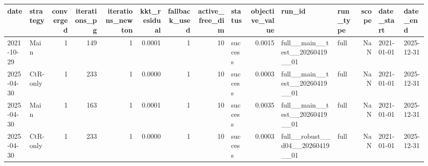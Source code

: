 \begin{tabular}{llrrrrrrlrllrll}
\toprule
date & strategy & converged & iterations_pg & iterations_newton & kkt_residual & fallback_used & active_free_dim & status & objective_value & run_id & run_type & scope & date_start & date_end \\
\midrule
2021-10-29 & Main & 1 & 149 & 1 & 0.0001 & 1 & 10 & success & 0.0015 & full__main__test__20260419__01 & full & NaN & 2021-01-01 & 2025-12-31 \\
2025-04-30 & CtR-only & 1 & 233 & 1 & 0.0000 & 1 & 10 & success & 0.0003 & full__main__test__20260419__01 & full & NaN & 2021-01-01 & 2025-12-31 \\
2025-04-30 & Main & 1 & 163 & 1 & 0.0001 & 1 & 10 & success & 0.0035 & full__main__test__20260419__01 & full & NaN & 2021-01-01 & 2025-12-31 \\
2025-04-30 & CtR-only & 1 & 233 & 1 & 0.0000 & 1 & 10 & success & 0.0003 & full__robust__d04__20260419__01 & full & NaN & 2021-01-01 & 2025-12-31 \\
\bottomrule
\end{tabular}
